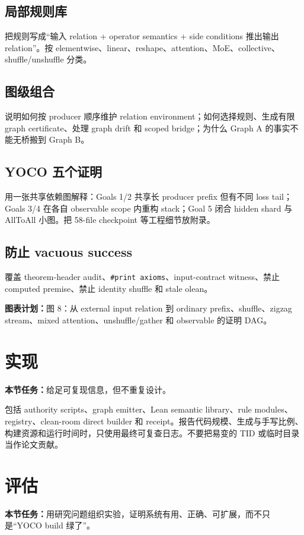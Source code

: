 \documentclass[11pt,a4paper]{ctexart}
\newcommand{\contract}[1]{\par\smallskip\noindent\colorbox{light}{\parbox{0.95\linewidth}{\textbf{本节任务：}#1}}\par\smallskip}
\newcommand{\figplan}[1]{\par\noindent\textbf{图表计划：}#1\par}
\begin{document}
\subsection{局部规则库}
把规则写成“输入 relation + operator semantics + side conditions 推出输出 relation”。按 elementwise、linear、reshape、attention、MoE、collective、shuffle/unshuffle 分类。

\subsection{图级组合}
说明如何按 producer 顺序维护 relation environment；如何选择规则、生成有限 graph certificate、处理 graph drift 和 scoped bridge；为什么 Graph A 的事实不能无桥搬到 Graph B。

\subsection{YOCO 五个证明}
用一张共享依赖图解释：Goals 1/2 共享长 producer prefix 但有不同 loss tail；Goals 3/4 在各自 observable scope 内重构 stack；Goal 5 闭合 hidden shard 与 AllToAll 小图。把 58-file checkpoint 等工程细节放附录。

\subsection{防止 vacuous success}
覆盖 theorem-header audit、\texttt{\#print axioms}、input-contract witness、禁止 computed premise、禁止 identity shuffle 和 stale olean。

\figplan{图 8：从 external input relation 到 ordinary prefix、shuffle、zigzag stream、mixed attention、unshuffle/gather 和 observable 的证明 DAG。}

\section{实现}
\contract{给足可复现信息，但不重复设计。}

包括 authority scripts、graph emitter、Lean semantic library、rule modules、registry、clean-room direct builder 和 receipt。报告代码规模、生成与手写比例、构建资源和运行时间时，只使用最终可复查日志。不要把易变的 TID 或临时目录当作论文贡献。

\section{评估}
\contract{用研究问题组织实验，证明系统有用、正确、可扩展，而不只是“YOCO build 绿了”。}
\end{document}
